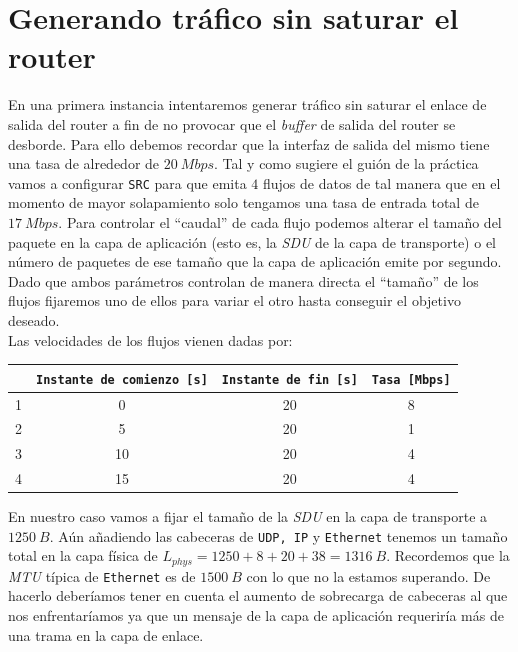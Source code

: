 \documentclass[11pt]{article}
\begin{document}
    \section{Generando tráfico sin saturar el router}
        En una primera instancia intentaremos generar tráfico sin saturar el enlace de salida del router a fin de no provocar que el \textit{buffer} de salida del router se desborde. Para ello debemos recordar que la interfaz de salida del mismo tiene una tasa de alrededor de $20\ Mbps$. Tal y como sugiere el guión de la práctica vamos a configurar \texttt{SRC} para que emita $4$ flujos de datos de tal manera que en el momento de mayor solapamiento solo tengamos una tasa de entrada total de $17\ Mbps$. Para controlar el ``caudal'' de cada flujo podemos alterar el tamaño del paquete en la capa de aplicación (esto es, la \textit{SDU} de la capa de transporte) o el número de paquetes de ese tamaño que la capa de aplicación emite por segundo. Dado que ambos parámetros controlan de manera directa el ``tamaño'' de los flujos fijaremos uno de ellos para variar el otro hasta conseguir el objetivo deseado.\\

        Las velocidades de los flujos vienen dadas por:

        \begin{center}
            \begin{tabular}{|c|c|c|c|}
                \hline
                & \texttt{Instante de comienzo [s]} & \texttt{Instante de fin [s]} & \texttt{Tasa [Mbps]}\\
                \hline
                1 & 0 & 20 & 8\\
                \hline
                2 & 5 & 20 & 1\\
                \hline
                3 & 10 & 20 & 4\\
                \hline
                4 & 15 & 20 & 4\\
                \hline
            \end{tabular}
        \end{center}

        En nuestro caso vamos a fijar el tamaño de la \textit{SDU} en la capa de transporte a $1250\ B$. Aún añadiendo las cabeceras de \texttt{UDP, IP} y \texttt{Ethernet} tenemos un tamaño total en la capa física de $L_{phys} = 1250 + 8 + 20 + 38 = 1316\ B$. Recordemos que la \textit{MTU} típica de \texttt{Ethernet} es de $1500\ B$ con lo que no la estamos superando. De hacerlo deberíamos tener en cuenta el aumento de sobrecarga de cabeceras al que nos enfrentaríamos ya que un mensaje de la capa de aplicación requeriría más de una trama en la capa de enlace.\\
\end{document}
